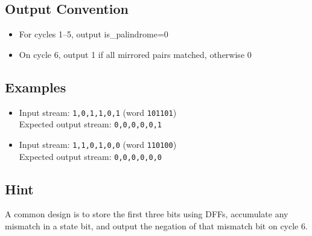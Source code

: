 \subsection*{Output Convention}
\begin{itemize}
  \item For cycles 1--5, output is_palindrome=0
  \item On cycle 6, output 1 if all mirrored pairs matched, otherwise 0
\end{itemize}

\subsection*{Examples}
\begin{itemize}
  \item Input stream: \texttt{1,0,1,1,0,1} (word \texttt{101101}) \\
  Expected output stream: \texttt{0,0,0,0,0,1}
  \item Input stream: \texttt{1,1,0,1,0,0} (word \texttt{110100}) \\
  Expected output stream: \texttt{0,0,0,0,0,0}
\end{itemize}

\subsection*{Hint}
A common design is to store the first three bits using DFFs, accumulate any mismatch in a state bit, and output the negation of that mismatch bit on cycle 6.